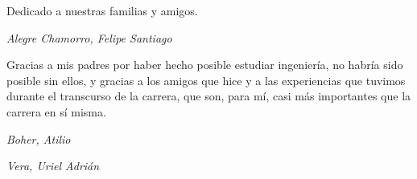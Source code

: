 

\begin{reconocimiento}{Dedicado a nuestras familias y amigos.}

\lipsum[5]

\begin{flushright}
\textit{Alegre Chamorro, Felipe Santiago}
\end{flushright}

\vspace{1cm}

Gracias a mis padres por haber hecho posible estudiar ingeniería, no habría sido posible sin ellos, y gracias a los amigos que hice y a las experiencias que tuvimos durante el transcurso de la carrera, que son, para mí, casi más importantes que la carrera en sí misma.

\begin{flushright}
\textit{Boher, Atilio}
\end{flushright}

\vspace{1cm}

\lipsum[5]

\begin{flushright}
\textit{Vera, Uriel Adrián}
\end{flushright}

\end{reconocimiento}